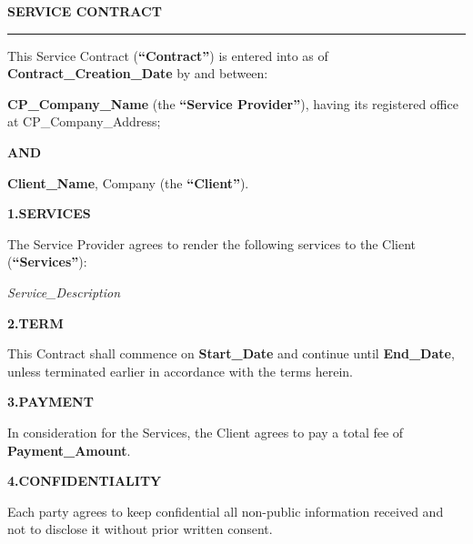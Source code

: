 \documentclass[9.5pt]{article}
\begin{document}
\vspace*{18pt}

{\fontsize{14pt}{17pt}\selectfont\bfseries\color{t2ldark}SERVICE CONTRACT}\par\vspace{2pt}
{\color{refgold}\rule{\linewidth}{1pt}}\par\vspace{8pt}

{\fontsize{9.5pt}{13.5pt}\selectfont\color{refcharcoal}

This Service Contract (\textbf{``Contract''}) is entered into as of
\textbf{{{Contract_Creation_Date}}} by and between:

\vspace{5pt}
\textbf{{{CP_Company_Name}}} (the \textbf{``Service Provider''}), having its
registered office at {{CP_Company_Address}};

\vspace{3pt}\textbf{AND}\vspace{3pt}

\textbf{{{Client_Name}}}, {{Company}} (the \textbf{``Client''}).

\vspace{5pt}
\textbf{\color{t2ldark}1.\enspace SERVICES}

The Service Provider agrees to render the following services to the Client
(\textbf{``Services''}):

\vspace{3pt}\textit{{{Service_Description}}}

\vspace{5pt}
\textbf{\color{t2ldark}2.\enspace TERM}

This Contract shall commence on \textbf{{{Start_Date}}} and continue until
\textbf{{{End_Date}}}, unless terminated earlier in accordance with the terms
herein.

\vspace{5pt}
\textbf{\color{t2ldark}3.\enspace PAYMENT}

In consideration for the Services, the Client agrees to pay a total fee of
\textbf{{{Payment_Amount}}}.

\vspace{5pt}
\textbf{\color{t2ldark}4.\enspace CONFIDENTIALITY}

Each party agrees to keep confidential all non-public information received and
not to disclose it without prior written consent.

}
\end{document}
